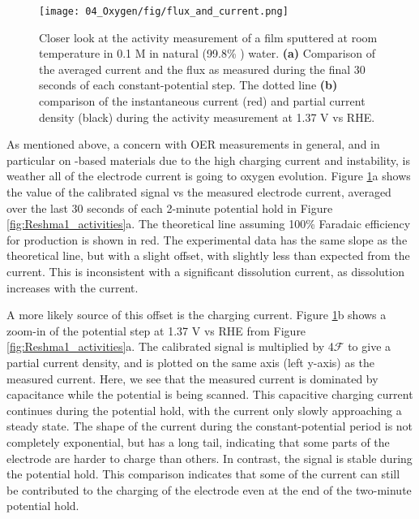 \begin{figure}[t]
	\texttt{[image: 04\_Oxygen/fig/flux\_and\_current.png]}
	\caption{Closer look at the activity measurement of a  film sputtered at room temperature in 0.1 M  in  natural (99.8\% ) water. \textbf{(a)} Comparison of the averaged current and the  flux as measured during the final 30 seconds of each constant-potential step. The dotted line  \textbf{(b)} comparison of the instantaneous current (red) and  partial current density (black) during the activity measurement at 1.37 V vs RHE.}
	\label{fig:flux_and_current}
\end{figure}

As mentioned above, a concern with OER measurements in general, and in particular on -based materials due to the high charging current and instability, is weather all of the electrode current is going to oxygen evolution. Figure \ref{fig:flux_and_current}a shows the value of the calibrated  signal vs the measured electrode current, averaged over the last 30 seconds of each 2-minute potential hold in Figure \ref{fig:Reshma1_activities}a. The theoretical line assuming 100\% Faradaic efficiency for  production is shown in red. The experimental data has the same slope as the theoretical line, but with a slight offset, with slightly less  than expected from the current. This is inconsistent with a significant dissolution current, as  dissolution increases with the current\cite{Cherevko2016}.

A more likely source of this offset is the charging current. Figure \ref{fig:flux_and_current}b shows a zoom-in of the potential step at 1.37 V vs RHE from Figure \ref{fig:Reshma1_activities}a. The calibrated  signal is multiplied by 4$\mathcal{F}$ to give a partial current density, and is plotted on the same axis (left y-axis) as the measured current. Here, we see that the measured current is dominated by capacitance while the potential is being scanned. This capacitive charging current continues during the potential hold, with the current only slowly approaching a steady state. The shape of the current during the constant-potential period is not completely exponential, but has a long tail, indicating that some parts of the electrode are harder to charge than others. In contrast, the  signal is stable during the potential hold. This comparison indicates that some of the current can still be contributed to the charging of the electrode even at the end of the two-minute potential hold.

